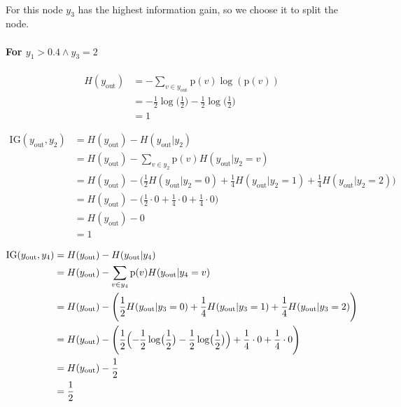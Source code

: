 \documentclass[12pt]{article}
\newcommand{\info}[2]{\frac{#1}{#2}\log\bigl( \frac{#1}{#2} \bigr)}
\begin{document}
\begin{enumerate}[leftmargin=\labelsep]
\paragraph{} For this node $y_3$ has the highest information gain, so we choose it to split the node.

\paragraph{For $y_1 > 0.4 \wedge y_3=2$}

\begin{equation}
    \begin{split}
        H(y_\textrm{out}) & = -\sum_{v \in y_\textrm{out}}\textrm{p}(v)\log(\textrm{p}(v)) \\
        & = -\info{1}{2} - \info{1}{2} \\
        & = 1
    \end{split}
\end{equation}

\begin{equation}
    \begin{split}
        \textrm{IG}(y_\textrm{out}, y_2) &= H(y_\textrm{out}) - H(y_\textrm{out}|y_2) \\
        & = H(y_\textrm{out}) - \sum_{v \in y_2}\textrm{p}(v)H(y_\textrm{out}|y_2=v) \\
        & = H(y_\textrm{out}) - \Biggl( \frac{1}{2}H(y_\textrm{out}|y_2=0) + \frac{1}{4}H(y_\textrm{out}|y_2=1) + \frac{1}{4}H(y_\textrm{out}|y_2=2)\Biggr) \\
        & = H(y_\textrm{out}) - \Biggl( \frac{1}{2} \cdot 0 + \frac{1}{4} \cdot 0 + \frac{1}{4} \cdot 0  \Biggr) \\
        & = H(y_\textrm{out}) - 0 \\
        & = 1
    \end{split}
\end{equation}

\begin{equation}
    \begin{split}
        \textrm{IG}(y_\textrm{out}, y_4) &= H(y_\textrm{out}) - H(y_\textrm{out}|y_4) \\
        & = H(y_\textrm{out}) - \sum_{v \in y_4}\textrm{p}(v)H(y_\textrm{out}|y_4=v) \\
        & = H(y_\textrm{out}) - \Biggl( \frac{1}{2}H(y_\textrm{out}|y_3=0) + \frac{1}{4}H(y_\textrm{out}|y_3=1) + \frac{1}{4}H(y_\textrm{out}|y_3=2)\Biggr) \\
        & = H(y_\textrm{out}) - \Biggl( \frac{1}{2} \Bigl( - \info{1}{2} - \info{1}{2} \Bigr) + \frac{1}{4} \cdot 0 + \frac{1}{4} \cdot 0  \Biggr) \\
        & = H(y_\textrm{out}) - \frac{1}{2} \\
        & = \frac{1}{2}
    \end{split}
\end{equation}


\end{enumerate}
\end{document}
